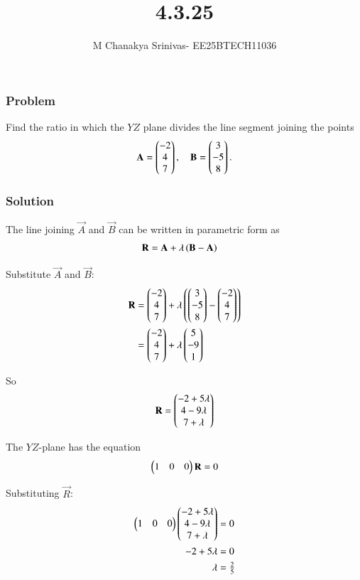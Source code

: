 \documentclass{beamer}
\title %
{4.3.25}
\date{}
\author %
{M Chanakya Srinivas- EE25BTECH11036}
\begin{document}
\frame{\titlepage}




\begin{frame}
\frametitle{Problem}

Find the ratio in which the $YZ$ plane divides the line segment joining the points 
\[
\mathbf{A} = \begin{pmatrix}-2\\4\\7\end{pmatrix}, \quad 
\mathbf{B} = \begin{pmatrix}3\\-5\\8\end{pmatrix}.
\]

\end{frame}

\begin{frame}
\frametitle{Solution}

The line joining $\vec{A}$ and $\vec{B}$ can be written in parametric form as
\begin{align}
\mathbf{R} &= \mathbf{A} + \lambda\left(\mathbf{B}-\mathbf{A}\right) \label{eq:line}
\end{align}

Substitute $\vec{A}$ and $\vec{B}$:
\begin{align}
\mathbf{R} 
&= \begin{pmatrix}-2\\4\\7\end{pmatrix} + \lambda \left(\begin{pmatrix}3\\-5\\8\end{pmatrix}-\begin{pmatrix}-2\\4\\7\end{pmatrix}\right) \\
&= \begin{pmatrix}-2\\4\\7\end{pmatrix} + \lambda \begin{pmatrix}5\\-9\\1\end{pmatrix} \label{eq:expand}
\end{align}

So
\begin{align}
\mathbf{R} = \begin{pmatrix}-2+5\lambda \\ 4-9\lambda \\ 7+\lambda\end{pmatrix}
\end{align}

\end{frame}

\begin{frame}

The $YZ$-plane has the equation 
\begin{align}
\begin{pmatrix}1 & 0 & 0\end{pmatrix}\mathbf{R} = 0 \label{eq:yzplane}
\end{align}

Substituting $\vec{R}$:
\begin{align}
\begin{pmatrix}1 & 0 & 0\end{pmatrix}\begin{pmatrix}-2+5\lambda \\ 4-9\lambda \\ 7+\lambda\end{pmatrix} &= 0 \\
-2+5\lambda &= 0 \\
\lambda &= \tfrac{2}{5} \label{eq:lambda}
\end{align}

\end{frame}
\end{document}
